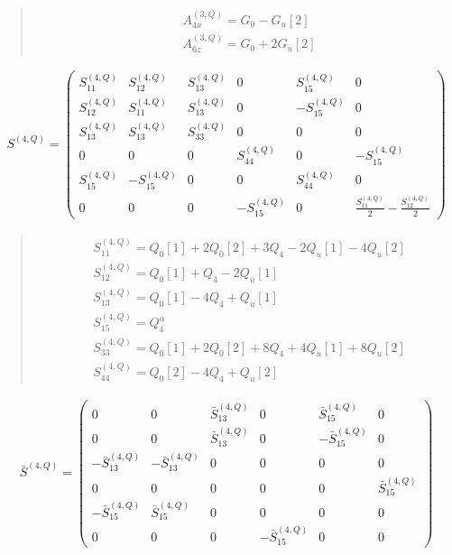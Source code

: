 \documentclass[fleqn,10pt]{jsarticle}
\begin{document}
\begin{quote}
\begin{align*}
& A^{(3,Q)}_{4x} = G_{0} - G_{u}[2] \\
& A^{(3,Q)}_{6z} = G_{0} + 2 G_{u}[2]
\end{align*}
\end{quote}
\begin{align*}
S^{(4,Q)} = \begin{pmatrix} S^{(4,Q)}_{11} & S^{(4,Q)}_{12} & S^{(4,Q)}_{13} & 0 & S^{(4,Q)}_{15} & 0 \\ S^{(4,Q)}_{12} & S^{(4,Q)}_{11} & S^{(4,Q)}_{13} & 0 & - S^{(4,Q)}_{15} & 0 \\ S^{(4,Q)}_{13} & S^{(4,Q)}_{13} & S^{(4,Q)}_{33} & 0 & 0 & 0 \\ 0 & 0 & 0 & S^{(4,Q)}_{44} & 0 & - S^{(4,Q)}_{15} \\ S^{(4,Q)}_{15} & - S^{(4,Q)}_{15} & 0 & 0 & S^{(4,Q)}_{44} & 0 \\ 0 & 0 & 0 & - S^{(4,Q)}_{15} & 0 & \frac{S^{(4,Q)}_{11}}{2} - \frac{S^{(4,Q)}_{12}}{2} \end{pmatrix}
\end{align*}
\begin{quote}
\begin{align*}
& S^{(4,Q)}_{11} = Q_{0}[1] + 2 Q_{0}[2] + 3 Q_{4} - 2 Q_{u}[1] - 4 Q_{u}[2] \\
& S^{(4,Q)}_{12} = Q_{0}[1] + Q_{4} - 2 Q_{u}[1] \\
& S^{(4,Q)}_{13} = Q_{0}[1] - 4 Q_{4} + Q_{u}[1] \\
& S^{(4,Q)}_{15} = Q_{4}^{\alpha} \\
& S^{(4,Q)}_{33} = Q_{0}[1] + 2 Q_{0}[2] + 8 Q_{4} + 4 Q_{u}[1] + 8 Q_{u}[2] \\
& S^{(4,Q)}_{44} = Q_{0}[2] - 4 Q_{4} + Q_{u}[2]
\end{align*}
\end{quote}
\begin{align*}
\bar{S}^{(4,Q)} = \begin{pmatrix} 0 & 0 & \bar{S}^{(4,Q)}_{13} & 0 & \bar{S}^{(4,Q)}_{15} & 0 \\ 0 & 0 & \bar{S}^{(4,Q)}_{13} & 0 & - \bar{S}^{(4,Q)}_{15} & 0 \\ - \bar{S}^{(4,Q)}_{13} & - \bar{S}^{(4,Q)}_{13} & 0 & 0 & 0 & 0 \\ 0 & 0 & 0 & 0 & 0 & \bar{S}^{(4,Q)}_{15} \\ - \bar{S}^{(4,Q)}_{15} & \bar{S}^{(4,Q)}_{15} & 0 & 0 & 0 & 0 \\ 0 & 0 & 0 & - \bar{S}^{(4,Q)}_{15} & 0 & 0 \end{pmatrix}
\end{align*}
\end{document}
